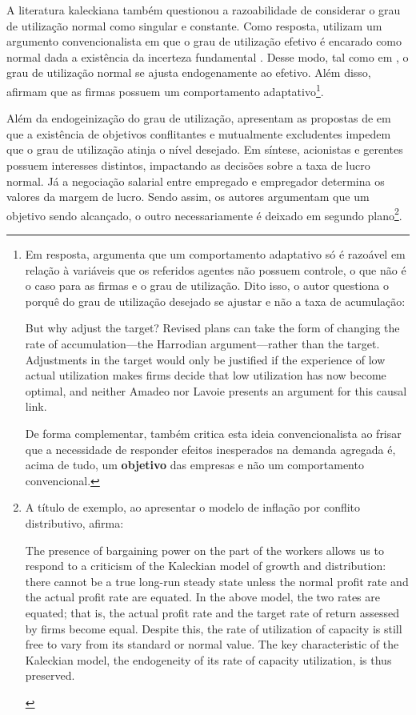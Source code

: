 A literatura kaleckiana também questionou a razoabilidade de considerar o grau de utilização normal como singular e constante. 
Como resposta, utilizam um argumento convencionalista em que o grau de utilização efetivo é encarado como normal dada a existência da incerteza fundamental \cite{lavoie_kaleckian_1995}. Desse modo, tal como em \textcite{amadeo_role_1986}, o grau de utilização normal se ajusta endogenamente ao efetivo. Além disso, afirmam que as firmas possuem um comportamento adaptativo\footnote{
Em resposta, \textcite{skott_theoretical_2012} argumenta que um comportamento adaptativo só é razoável em relação à variáveis que os referidos agentes não possuem controle, o que não é o caso para as firmas e o grau de utilização. Dito isso, o autor questiona o porquê do grau de utilização desejado se ajustar e não a taxa de acumulação:

\begin{citacao}
	But why adjust the target? Revised plans can take the form of changing the rate of accumulation—the Harrodian argument—rather than the target. Adjustments in the target would only be justified if the experience of low actual utilization makes firms decide that low utilization has now become optimal, and neither Amadeo nor Lavoie presents an argument for this causal link. \cite[p.120]{skott_theoretical_2012}
\end{citacao}
De forma complementar, \textcite{nikiforos_utilization_2016} também critica esta ideia convencionalista ao frisar que a necessidade de responder efeitos inesperados na demanda agregada é, acima de tudo, um \textbf{objetivo} das empresas e não um comportamento convencional. 
}. 

Além da endogeinização do grau de utilização, \textcite{hein_harrodian_2012} apresentam as propostas de \textcite{dallery_conflicting_2011} em que a existência de objetivos conflitantes e mutualmente excludentes impedem que o grau de utilização atinja o nível desejado. Em síntese, acionistas e gerentes possuem interesses distintos, impactando as decisões sobre a taxa de lucro normal. Já a negociação salarial entre empregado e empregador determina os valores da margem de lucro. Sendo assim, os autores argumentam que um objetivo sendo alcançado, o outro necessariamente é deixado em segundo plano\footnote{
	A título de exemplo, ao apresentar o modelo de inflação por conflito distributivo, \textcite[p.~567]{lavoie_post-keynesian_2015} afirma:
	\begin{citacao}
		The presence of bargaining power on the part of the workers allows
		us to respond to a criticism of the Kaleckian model of growth and distribution: there
		cannot be a true long-run steady state unless the normal profit rate and the actual profit
		rate are equated. In the above model, the two rates are equated; that is, the actual profit
		rate and the target rate of return assessed by firms become equal. Despite this, the rate
		of utilization of capacity is still free to vary from its standard or normal value. The key
		characteristic of the Kaleckian model, the endogeneity of its rate of capacity utilization,
		is thus preserved.
	\end{citacao}
}.

